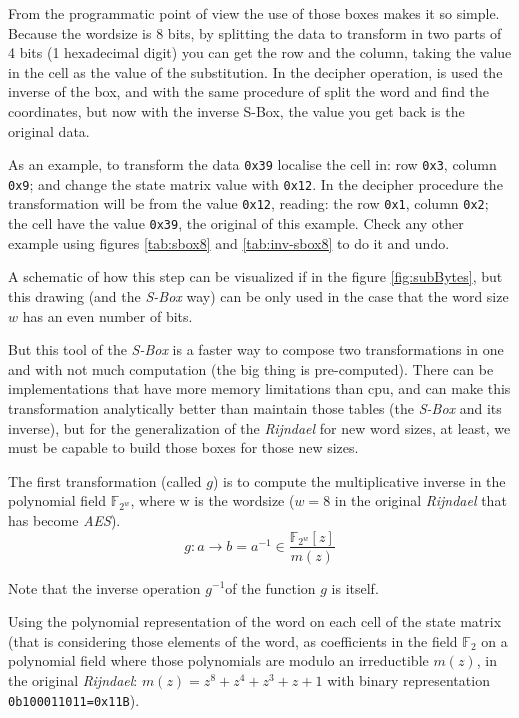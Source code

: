 \documentclass[10pt,a4paper,twoside]{llncs}
\newcommand{\Fq}[1]{\ensuremath{\mathbb{F}_#1}}
\newcommand{\Fpn}[2]{\ensuremath{\mathbb{F}_{#1^#2}}}
\newcommand{\Fpnm}[2]{\ensuremath{\frac{\Fpn{2}{#1}[#2]}{m(#2)}}}
\begin{document}
From the programmatic point of view the use of those boxes makes it so simple. Because the wordsize is 8 bits, by splitting the data to transform in two parts of 4 bits (1 hexadecimal digit) you can get the row and the column, taking the value in the cell as the value of the substitution. In the decipher operation, is used the inverse of the box, and with the same procedure of split the word and find the coordinates, but now with the inverse S-Box, the value you get back is the original data.

As an example, to transform the data \texttt{0x39} localise the cell in: row \texttt{0x3}, column \texttt{0x9}; and change the state matrix value with \texttt{0x12}. In the decipher procedure the transformation will be from the value \texttt{0x12}, reading: the row \texttt{0x1}, column \texttt{0x2}; the cell have the value \texttt{0x39}, the original of this example. Check any other example using figures \ref{tab:sbox8} and \ref{tab:inv-sbox8} to do it and undo.

A schematic of how this step can be visualized if in the figure \ref{fig:subBytes}, but this drawing (and the \emph{S-Box} way) can be only used in the case that the word size $w$ has an even number of bits.


But this tool of the \emph{S-Box} is a faster way to compose two transformations in one and with not much computation (the big thing is pre-computed). There can be implementations that have more memory limitations than cpu, and can make this transformation analytically better than maintain those tables (the \emph{S-Box} and its inverse), but for the generalization of the \emph{Rijndael} for new word sizes, at least, we must be capable to build those boxes for those new sizes.

The first transformation (called $g$) is to compute the multiplicative inverse in the polynomial field \Fpn{2}{w}, where w is the wordsize ($w=8$ in the original \emph{Rijndael} that has become \emph{AES}).
\begin{equation}\label{eq:multInvPolyField}
 g:a\rightarrow b = a^{-1} \in \Fpnm{w}{z} 
\end{equation}

Note that the inverse operation $g^{-1}$of the function $g$ is itself.

Using the polynomial representation of the word on each cell of the state matrix (that is considering those elements of the word, as coefficients in the field \Fq{2} on a polynomial field where those polynomials are modulo an irreductible $m(z)$, in the original \emph{Rijndael}: $m(z)=z^8+z^4+z^3+z+1$ with binary representation \texttt{0b100011011=0x11B}).
\end{document}
